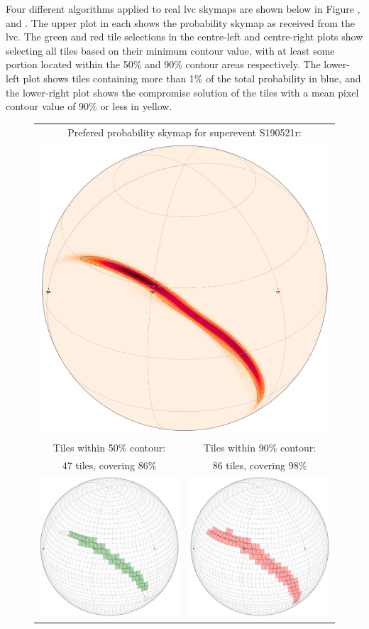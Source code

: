 \begin{colsection}
\begin{colsection}
Four different algorithms applied to real \gls{lvc} skymaps are shown below in Figure ,  and . The upper plot in each shows the probability skymap as received from the \gls{lvc}. The green and red tile selections in the centre-left and centre-right plots show selecting all tiles based on their minimum contour value, with at least some portion located within the 50\% and 90\% contour areas respectively. The lower-left plot shows tiles containing more than 1\% of the total probability in blue, and the lower-right plot shows the compromise solution of the tiles with a mean pixel contour value of 90\% or less in yellow.


\begin{figure}[p]
\begin{center}
\begin{tabular}{cc}
\multicolumn{2}{c}{Prefered probability skymap for superevent S190521r:}
\\
\multicolumn{2}{c}{\includegraphics[width=0.5\linewidth]{images/tiling/1_0.png}}
\\
Tiles within 50\% contour: &
Tiles within 90\% contour:
\\
47 tiles, covering 86\% &
86 tiles, covering 98\%
\\
\includegraphics[width=0.25\linewidth]{images/tiling/1_c.png} &
\includegraphics[width=0.25\linewidth]{images/tiling/1_d.png}

\end{tabular}
\end{center}
\end{figure}
\end{colsection}
\end{colsection}
